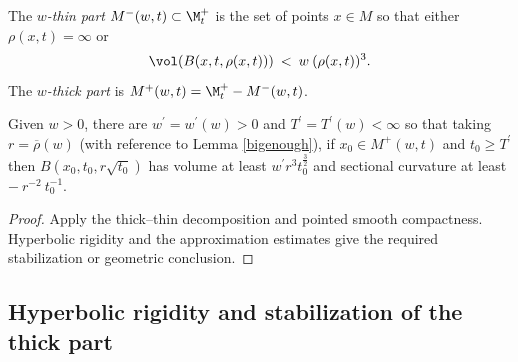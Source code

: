 \begin{definition}
  \label{def:kl-thick-thin-decomposition-thick-thin-decomposition}

The {\em $w$-thin part} $M^-(w, t) \subset \M_t^+$ is the set of points
$x \in M$ so that either $\rho(x,t)=\infty$ or
\begin{equation}
\vol(B(x, t, \rho(x, t))) \: < \: w \:
(\rho(x, t))^3.
\end{equation}
The {\em $w$-thick part} is $M^+(w, t) = \M_t^+  - M^-(w, t)$.
\end{definition}

\begin{lemma}
  \label{lem:kl-thick-thin-decomposition-existence-thick-thin-geometry}
 \label{applies}
Given $w > 0$, there are
$w^\prime = w^\prime(w) > 0$ and $T^\prime = T^\prime(w) < \infty$ so that
taking $r = \overline{\rho}(w)$
(with reference to Lemma \ref{bigenough}),
if $x_0 \in M^+(w,t)$ and $t_0 \ge T^\prime$ then
$B(x_0, t_0, r\sqrt{t_0})$ has volume at least $w^\prime r^3 t_0^{\frac32}$ and
sectional curvature at least $- \: r^{-2} \: t_0^{-1}$.
\end{lemma}

\begin{proof}
\sketch Apply the thick--thin decomposition and pointed smooth compactness. Hyperbolic rigidity and the approximation estimates give the required stabilization or geometric conclusion.
\end{proof}

\subsection{Hyperbolic rigidity and stabilization of the thick part}
\label{hyprig}

